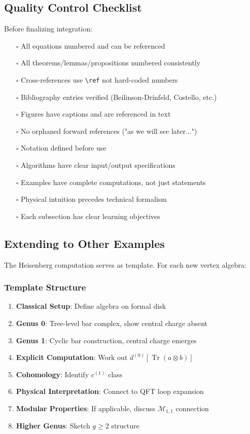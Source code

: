 \subsection{Quality Control Checklist}

Before finalizing integration:

\begin{itemize}
\item[$\square$] All equations numbered and can be referenced
\item[$\square$] All theorems/lemmas/propositions numbered consistently
\item[$\square$] Cross-references use \texttt{\textbackslash ref} not hard-coded numbers
\item[$\square$] Bibliography entries verified (Beilinson-Drinfeld, Costello, etc.)
\item[$\square$] Figures have captions and are referenced in text
\item[$\square$] No orphaned forward references ("as we will see later...")
\item[$\square$] Notation defined before use
\item[$\square$] Algorithms have clear input/output specifications
\item[$\square$] Examples have complete computations, not just statements
\item[$\square$] Physical intuition precedes technical formalism
\item[$\square$] Each subsection has clear learning objectives
\end{itemize}

\subsection{Extending to Other Examples}

The Heisenberg computation serves as template. For each new vertex algebra:

\subsubsection{Template Structure}
\begin{enumerate}
\item \textbf{Classical Setup}: Define algebra on formal disk
\item \textbf{Genus 0}: Tree-level bar complex, show central charge absent
\item \textbf{Genus 1}: Cyclic bar construction, central charge emerges
\item \textbf{Explicit Computation}: Work out $d^{(0)}[\operatorname{Tr}(a \otimes b)]$
\item \textbf{Cohomology}: Identify $c^{(1)}$ class
\item \textbf{Physical Interpretation}: Connect to QFT loop expansion
\item \textbf{Modular Properties}: If applicable, discuss $\mathcal{M}_{1,1}$ connection
\item \textbf{Higher Genus}: Sketch $g \geq 2$ structure
\end{enumerate}

